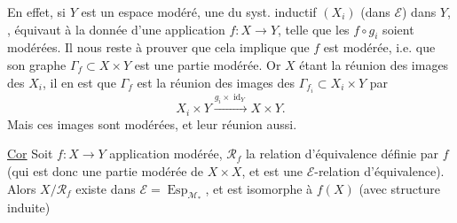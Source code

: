 En effet, si $Y$ est un espace modéré, une   du syst. inductif $(X_i)$ (dans $\mathcal E$) dans $Y$, , équivaut à la donnée d'une application $f:X\longrightarrow Y$, telle que les $f\circ g_i$ soient modérées. Il nous reste à prouver que cela implique que $f$ est modérée, i.e. que son graphe $\Gamma_f\subset X\times Y$ est une partie modérée. Or $X$ étant la réunion des images des $X_i$, il en est que $\Gamma_f$ est la réunion des images des $\Gamma_{f_i}\subset X_i\times Y$ par
\[
 X_i\times Y\xrightarrow{g_i\times\operatorname{id}_Y}X\times Y.
\]
Mais ces images sont modérées, et  leur réunion aussi.

\uline{Cor} Soit $f:X\longrightarrow Y$ application modérée, $\mathcal R_f$ la relation d'équivalence définie par $f$ (qui est donc une partie modérée de $X\times X$, et est une $\mathcal E$-relation d'équivalence). Alors $X/\mathcal R_f$ existe dans $\mathcal E=\operatorname{Esp}_{\mathcal M_*}$, et est  isomorphe à $f(X)$ (avec structure induite)


